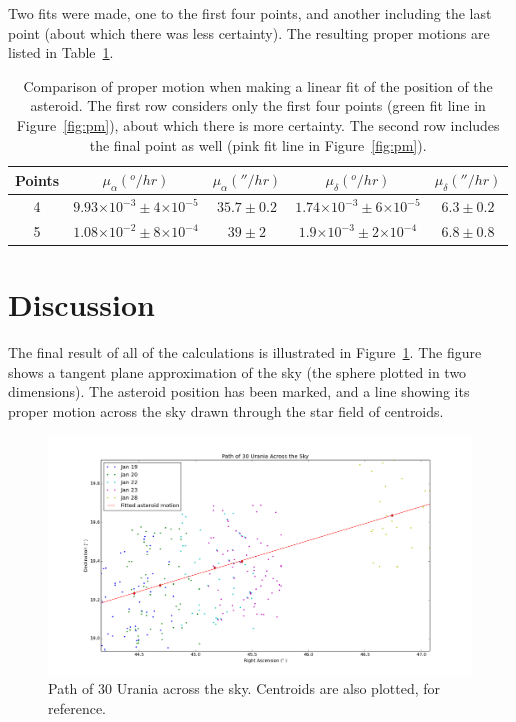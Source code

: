\documentclass[a4paper,12pt]{article}
\providecommand{\e}[1]{\ensuremath{\times 10^{#1}}}
\begin{document}
Two fits were made, one to the first four points, and another including the last point (about which there was less certainty). The resulting proper motions are listed in Table~\ref{tab:pm}.

\begin{center}
\begin{table}[!htbp]
  \centering
  \begin{tabular}{c||c||c||c||c}
  	Points & $\mu_{\alpha} (^o/hr)$ & $\mu_{\alpha} (''/hr)$ & $\mu_{\delta} (^o/hr)$ & $\mu_{\delta} (''/hr)$ \\
  	\hline
  	4 & $9.93\e{-3}\pm 4\e{-5}$ & $35.7\pm 0.2$ & $1.74\e{-3}\pm 6\e{-5}$& $6.3\pm 0.2$ \\
  	5 & $1.08\e{-2}\pm 8\e{-4}$ & $39\pm 2$ & $1.9\e{-3}\pm 2\e{-4}$ & $6.8\pm 0.8$ \\
   \end{tabular}
    \caption{Comparison of proper motion when making a linear fit of the position of the asteroid. The first row considers only the first four points (green fit line in Figure~\ref{fig:pm}), about which there is more certainty. The second row includes the final point as well (pink fit line in Figure~\ref{fig:pm}).}
    \label{tab:pm}
\end{table}
\end{center}




\section{Discussion}
\label{sec:discussion}

The final result of all of the calculations is illustrated in Figure~\ref{fig:path}. The figure shows a tangent plane approximation of the sky (the sphere plotted in two dimensions). The asteroid position has been marked, and a line showing its proper motion across the sky drawn through the star field of centroids.

\begin{figure}[!htbp]
\centering
\includegraphics[width = \linewidth]{path_urania.png}
\caption{Path of 30 Urania across the sky. Centroids are also plotted, for reference.}
\label{fig:path}
\end{figure}
\end{document}
